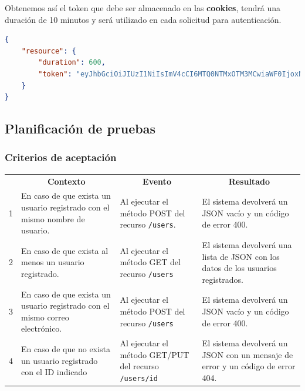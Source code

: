    Obtenemos así el token que debe ser almacenado en las \textbf{cookies}, tendrá una duración de 10 minutos y será utilizado en cada solicitud para autenticación.
   
\begin{lstlisting}[language=json]
{
    "resource": {
        "duration": 600, 
        "token": "eyJhbGciOiJIUzI1NiIsImV4cCI6MTQ0NTMxOTM3MCwiaWF0IjoxNDQ1MzE4NzcwfQ.eyJpZCI6Mn0.2eZRjbMq9tg4GykJx8EU-Ux4ZoyUW6WnBlADsvnpQvE"
    }
}
\end{lstlisting}


\subsection{Planificación de pruebas}

\subsubsection{Criterios de aceptación}

\begin{center}
\begin{longtable}{|m{0.5cm}|m{4cm}|m{4cm}|m{4.5cm}|}
\hline \rowcolor[gray]{0.9}
	\multicolumn{4}{|c|}{\textbf{Criterios de aceptación}} \\
    \hline  \rowcolor[gray]{0.9}
        \multicolumn{1}{|c|}{\textbf{ID}} &
        \multicolumn{1}{c|}{\textbf{Contexto}} &
        \multicolumn{1}{c|}{\textbf{Evento}} &
        \multicolumn{1}{c|}{\textbf{Resultado}} \\
    \hline
    \endhead
1&En caso de que exista un usuario registrado con el mismo nombre de usuario. & Al ejecutar el método POST del recurso \texttt{/users}.  & El sistema devolverá un JSON vacío y un código de error 400. \\ \hline
	\hline
2&En caso de que exista al menos un usuario registrado. & Al ejecutar el método GET del recurso \texttt{/users}  & El sistema devolverá una lista de JSON con los datos de los usuarios registrados. \\ 		\hline
	\hline
3&En caso de que exista un usuario registrado con el mismo correo electrónico. & Al ejecutar el método POST del recurso \texttt{/users}  & El sistema devolverá un JSON vacío y un código de error 400. \\ \hline
    \hline
4&En caso de que no exista un usuario registrado con el ID indicado & Al ejecutar el método GET/PUT del recurso \texttt{/users/id}  & El sistema devolverá un JSON con un mensaje de error y un código de error 404. \\ \hline

  \end{longtable}
\end{center}

